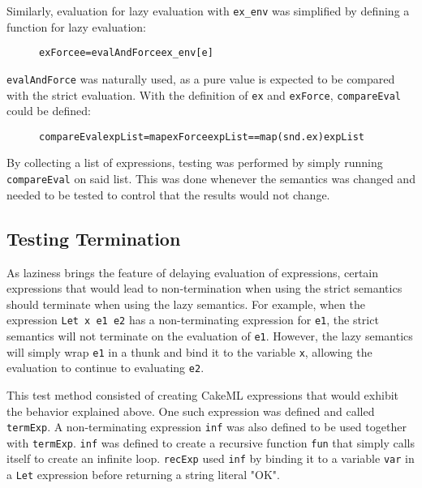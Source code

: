 \noindent Similarly, evaluation for lazy evaluation with \texttt{ex\_env} was
simplified by defining a function for lazy evaluation:

\begin{figure}[H]
\begin{alltt}
  exForce e = evalAndForce ex_env [e]
\end{alltt}
\end{figure}

\noindent \texttt{evalAndForce} was naturally used, as a pure value is expected
to be compared with the strict evaluation. With the definition of \texttt{ex}
and \texttt{exForce}, \texttt{compareEval} could be defined:

\begin{figure}[H]
\begin{alltt}
  compareEval expList = map exForce expList == map (snd . ex) expList
\end{alltt}
\end{figure}

By collecting a list of expressions, testing was performed by simply running
\texttt{compareEval} on said list. This was done whenever the semantics was
changed and needed to be tested to control that the results would not change.


\subsection{Testing Termination}
As laziness brings the feature of delaying evaluation of expressions, certain
expressions that would lead to non-termination when using the strict semantics
should terminate when using the lazy semantics. For example, when the expression
\texttt{Let x e1 e2} has a non-terminating expression for \texttt{e1}, the
strict semantics will not terminate on the evaluation of \texttt{e1}. However,
the lazy semantics will simply wrap \texttt{e1} in a thunk and bind it to the
variable \texttt{x}, allowing the evaluation to continue to evaluating
\texttt{e2}.

This test method consisted of creating CakeML expressions that would exhibit the
behavior explained above. One such expression was defined and called
\texttt{termExp}. A non-terminating expression \texttt{inf} was also defined to
be used together with \texttt{termExp}.
\texttt{inf} was defined to create a recursive function \texttt{fun}
that simply calls itself to create an infinite loop. \texttt{recExp} used
\texttt{inf} by binding it to a variable \texttt{var} in a \texttt{Let}
expression before returning a string literal "OK".

